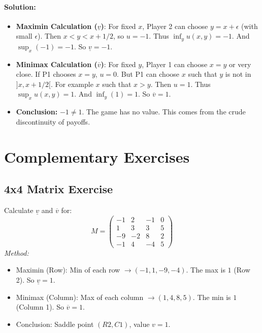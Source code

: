\paragraph{Solution:}
\begin{itemize}
    \item \textbf{Maximin Calculation ($\underline{v}$)}:
    For fixed $x$, Player 2 can choose $y=x + \epsilon$ (with small $\epsilon$). Then $x < y < x+1/2$, so $u=-1$.
    Thus $\inf_y u(x,y) = -1$.
    And $\sup_x (-1) = -1$. So $\underline{v} = -1$.
    
    \item \textbf{Minimax Calculation ($\overline{v}$)}:
    For fixed $y$, Player 1 can choose $x = y$ or very close.
    If P1 chooses $x=y$, $u=0$.
    But P1 can choose $x$ such that $y$ is not in $]x, x+1/2[$. For example $x$ such that $x > y$. Then $u=1$.
    Thus $\sup_x u(x,y) = 1$.
    And $\inf_y (1) = 1$. So $\overline{v} = 1$.
    
    \item \textbf{Conclusion:} $-1 \ne 1$. The game has no value. This comes from the crude discontinuity of payoffs.
\end{itemize}

\section{Complementary Exercises}

\subsection{4x4 Matrix Exercise}
Calculate $\underline{v}$ and $\overline{v}$ for:
$$M = \begin{pmatrix} -1 & 2 & -1 & 0 \\ 1 & 3 & 3 & 5 \\ -9 & -2 & 8 & 2 \\ -1 & 4 & -4 & 5 \end{pmatrix}$$
\textit{Method:}
\begin{itemize}
    \item Maximin (Row): Min of each row $\to (-1, 1, -9, -4)$. The max is $1$ (Row 2). So $\underline{v} = 1$.
    \item Minimax (Column): Max of each column $\to (1, 4, 8, 5)$. The min is $1$ (Column 1). So $\overline{v} = 1$.
    \item Conclusion: Saddle point $(R2, C1)$, value $v=1$.
\end{itemize}

